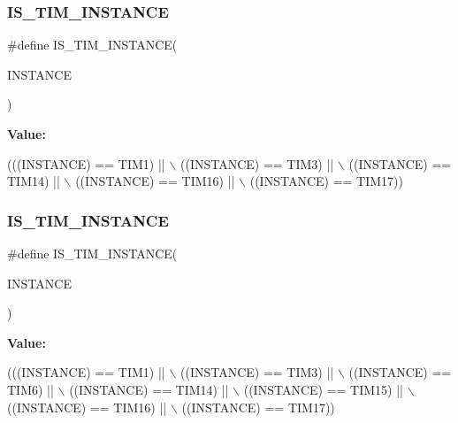 \subsubsection{\texorpdfstring{I\+S\+\_\+\+T\+I\+M\+\_\+\+I\+N\+S\+T\+A\+N\+CE}{IS\_TIM\_INSTANCE}\hspace{0.1cm}{\footnotesize\ttfamily [1/16]}}
{\footnotesize\ttfamily \#define I\+S\+\_\+\+T\+I\+M\+\_\+\+I\+N\+S\+T\+A\+N\+CE(\begin{DoxyParamCaption}\item[{}]{I\+N\+S\+T\+A\+N\+CE }\end{DoxyParamCaption})}

{\bfseries Value\+:}
\begin{DoxyCode}
(((INSTANCE) == TIM1)    || \(\backslash\)
   ((INSTANCE) == TIM3)    || \(\backslash\)
   ((INSTANCE) == TIM14)   || \(\backslash\)
   ((INSTANCE) == TIM16)   || \(\backslash\)
   ((INSTANCE) == TIM17))
\end{DoxyCode}
\mbox{\label{group___exported__macro_gaba506eb03409b21388d7c5a6401a4f98}} 
\subsubsection{\texorpdfstring{I\+S\+\_\+\+T\+I\+M\+\_\+\+I\+N\+S\+T\+A\+N\+CE}{IS\_TIM\_INSTANCE}\hspace{0.1cm}{\footnotesize\ttfamily [2/16]}}
{\footnotesize\ttfamily \#define I\+S\+\_\+\+T\+I\+M\+\_\+\+I\+N\+S\+T\+A\+N\+CE(\begin{DoxyParamCaption}\item[{}]{I\+N\+S\+T\+A\+N\+CE }\end{DoxyParamCaption})}

{\bfseries Value\+:}
\begin{DoxyCode}
(((INSTANCE) == TIM1)    || \(\backslash\)
   ((INSTANCE) == TIM3)    || \(\backslash\)
   ((INSTANCE) == TIM6)    || \(\backslash\)
   ((INSTANCE) == TIM14)   || \(\backslash\)
   ((INSTANCE) == TIM15)   || \(\backslash\)
   ((INSTANCE) == TIM16)   || \(\backslash\)
   ((INSTANCE) == TIM17))
\end{DoxyCode}
\mbox{\label{group___exported__macro_gaba506eb03409b21388d7c5a6401a4f98}} 
